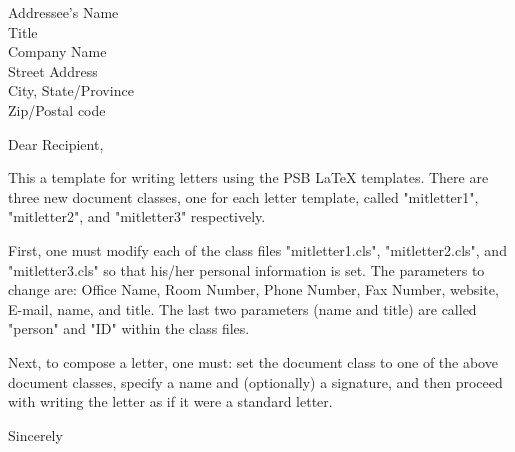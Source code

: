 \documentclass{mitletter1}
\begin{document}
\signature{Your Name\\{\it Your Title}}



\begin{letter}{Addressee's Name\\
Title\\
Company Name\\
Street Address\\
City, State/Province\\
Zip/Postal code}


\opening{Dear Recipient,}
This a template for writing letters using the PSB LaTeX templates.  There
are three new document classes, one for each letter template, called
"mitletter1", "mitletter2", and "mitletter3" respectively.
                                                                                
First, one must modify each of the class files "mitletter1.cls",
"mitletter2.cls", and "mitletter3.cls" so that his/her personal
information is set.  The parameters to change are: Office Name, Room
Number, Phone Number, Fax Number, website, E-mail, name, and title.  The
last two parameters (name and title) are called "person" and "ID" within
the class files.
                                                                                
Next, to compose a letter, one must: set the document class to one of the
above document classes, specify a name and (optionally) a signature, and
then proceed with writing the letter as if it were a standard letter.

\closing{Sincerely}

\end{letter}
\end{document}
